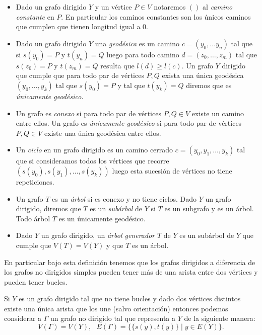 \documentclass[tesis.tex]{subfiles}
\begin{document}
\begin{leoenv}
\begin{deff}
\begin{itemize}
		\item Dado un grafo dirigido $Y$ y un vértice $P \in V$ notaremos $()$ al \emph{camino constante} en $P$. 
		En particular los caminos constantes son los únicos caminos que cumplen que tienen longitud igual a $0$.

		\item Dado un grafo dirigido $Y$ una \emph{geodésica} es un camino $c = (y_0, \dots y_n)$ tal que si $s(y_0)=P$ y $t(y_n)=Q$ luego para todo camino $d = (z_0, \dots, z_m)$ tal que $s(z_0) = P$ y $t(z_m) = Q$ resulta que $l(d) \ge l(c)$.
		Un grafo $Y$ dirigido que cumple que para todo par de vértices $P,Q$ exista una única geodésica $(y_0, \dots, y_k)$ tal que $s(y_0) = P$ y tal que $t(y_k) = Q$ diremos que es \emph{únicamente geodésico.}
		
		\item 	Un grafo es \emph{conexo} si para todo par de vértices $P, Q \in V$ existe un camino entre ellos.
		Un grafo es \emph{únicamente geodésico} si para todo par de vértices $P,Q \in V$ existe una única geodésica entre ellos.
		
		
		\item Un \emph{ciclo} en un grafo dirigido es un camino cerrado $c = (y_0, y_1, \dots, y_k)$ tal que si consideramos todos los vértices que recorre $(s(y_0),s(y_{1}), \dots, s(y_{k}))$ luego esta sucesión de vértices no tiene repeticiones.
		
				
		\item Un grafo $T$ es un \emph{árbol} si es conexo y no tiene ciclos.
		Dado $Y$ un grafo dirigido, diremos que $T$ es un \emph{subárbol} de $Y$ si $T$ es un subgrafo y es un árbol. 
		Todo árbol $T$ es un únicamente geodésico.
		
		\item Dado $Y$ un grafo dirigido, un \emph{árbol generador} $T$ de $Y$ es un subárbol de $Y$ que cumple que $V(T) = V(Y)$ y que $T$ es un árbol.
		
	\end{itemize}
\end{deff}

En particular bajo esta definición tenemos que los grafos dirigidos a diferencia de los grafos no dirigidos simples pueden tener más de una arista entre dos vértices y pueden tener bucles.

Si $Y$ es un grafo dirigido tal que no tiene bucles y dado dos vértices distintos existe una única arista que los une (salvo orientación) entonces podemos considerar a $\Gamma$ un grafo no dirigido tal que representa a $Y$ de la siguiente manera:
\[
V(\Gamma) = V(Y), \ \ \ E(\Gamma) = \{ \{s(y), t(y) \} \mid y \in E(Y) \}.
\]


\end{leoenv}
\end{document}
